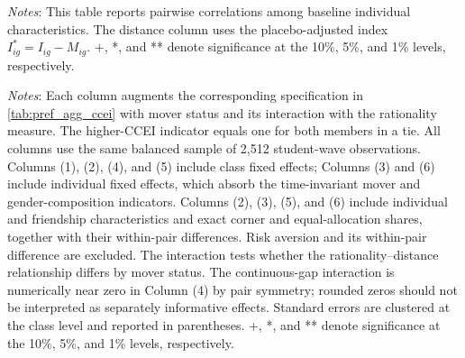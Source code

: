 \documentclass[11 pt]{article}
\renewcommand{\arraystretch}{1.2} %
\begin{document}
\begin{landscape}
\begin{table}[H]
\centering
\footnotesize
\begin{threeparttable}
\caption{Correlation Table}
\label{tab:corr_ihat}

\begin{tablenotes}[flushleft]
\footnotesize
\item[] \emph{Notes}: This table reports pairwise correlations among baseline
individual characteristics. The distance column uses the placebo-adjusted index $I^*_{ig}=I_{ig}-M_{ig}$. +, *, and ** denote significance at the 10\%, 5\%, and
1\% levels, respectively.
\end{tablenotes}
\end{threeparttable}
\end{table}
\end{landscape}

\begin{table}[H]
\centering
\singlespacing
\caption{Individual Rationality and Revealed-Preference Distance by Mover Status}
\label{tab:bargaining_ccei_ihat_mover}
\footnotesize
\setlength{\tabcolsep}{3pt}
\renewcommand{\arraystretch}{1.1}
\begin{minipage}{\textwidth}
\footnotesize
\emph{Notes}:   Each column augments the corresponding specification in \autoref{tab:pref_agg_ccei} with mover status and its interaction with the rationality measure. The higher-CCEI indicator equals one for both members in a tie. All columns use the same balanced sample of 2,512 student-wave observations. Columns (1), (2), (4), and (5) include class fixed effects; Columns (3) and (6) include individual fixed effects, which absorb the time-invariant mover and gender-composition indicators. Columns (2), (3), (5), and (6) include individual and friendship characteristics and exact corner and equal-allocation shares, together with their within-pair differences. Risk aversion and its within-pair difference are excluded. The interaction tests whether the rationality--distance relationship differs by mover status. The continuous-gap interaction is numerically near zero in Column (4) by pair symmetry; rounded zeros should not be interpreted as separately informative effects. Standard errors are clustered at the class level and reported in parentheses. +, *, and ** denote significance at the 10\%, 5\%, and 1\% levels, respectively.
\end{minipage}
\end{table}
\end{document}
